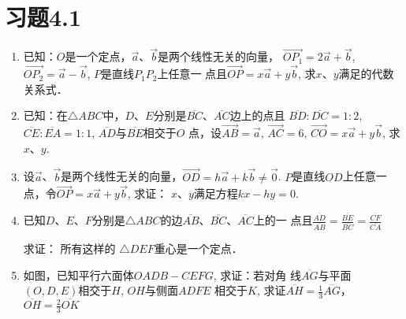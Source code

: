 \section*{习题4.1}

\begin{enumerate}
    \item 已知：$O$是一个定点，$\vec{a}$、$\vec{b}$是两个线性无关的向量，
$\Vec{OP_1}=2\vec{a}+\vec{b}$, $\Vec{OP_2}=\vec{a}-\vec{b}$, $P$是直线$P_1P_2$上任意一
    点且$\Vec{OP}=x\vec{a}+y\vec{b}$, 求$x$、$y$满足的代数关系式．
    \item 已知：在$\triangle ABC$中，$D$、$E$分别是$\overline{BC}$、$\overline{AC}$边上的点且
    $\overline{BD}:\overline{DC}=1:2$, $\overline{CE}:\overline{EA}=1:1$, $\overline{AD}$与$\overline{BE}$相交于$O$
    点，设$\Vec{AB}=\vec{a}$, $\Vec{AC}=6$, $\Vec{CO}=x\vec{a}+y\vec{b}$, 求$x$、$y$.
    \item 设$\vec{a}$、$\vec{b}$是两个线性无关的向量，$\Vec{OD}=h\vec{a}+k\vec{b}\ne \vec{0}$.
    $P$是直线$OD$上任意一点，令$\Vec{OP}=x\vec{a}+y\vec{b}$, 求证：
    $x$、$y$满足方程$kx-hy=0$.
    \item 已知$D$、$E$、$F$分别是$\triangle ABC$的边$\overline{AB}$、$\overline{BC}$、$\overline{AC}$上的一
    点且$\frac{\overline{AD}}{\overline{AB}}=\frac{\overline{BE}}{\overline{BC}}=\frac{\overline{CF}}{\overline{CA}}$

    求证：
    所有这样的
    $\triangle DEF$重心是一个定点．

\item 如图，已知平行六面体$OADB-CEFG$, 求证：若对角
线$\overline{AG}$与平面$(O,D,E)$相交于$H$, $OH$与侧面$ADFE$
相交于$K$, 求证$\overline{AH}=\frac{1}{3}\overline{AG}$，$\overline{OH}=\frac{2}{3}\overline{OK}$

\begin{figure}[htp]\centering
    \begin{minipage}[t]{0.48\textwidth}
    \centering
{}
\end{minipage}
\end{figure}
\end{enumerate}
